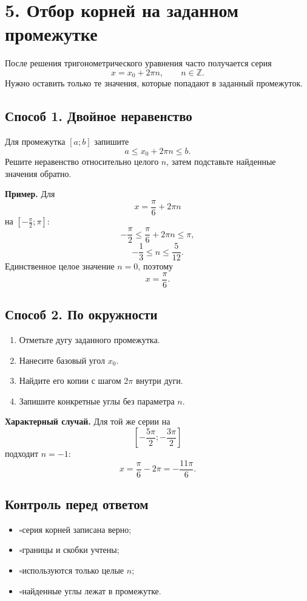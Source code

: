 \documentclass[a4paper,12pt]{article}
\newcommand{\checkitem}{\(\square\)\hspace{0.45em}}
\newcommand{\sectionrule}{\par\vspace{-0.3em}{\color{accent}\rule{\linewidth}{0.7pt}}\vspace{0.6em}}
\begin{document}
\section*{5. Отбор корней на заданном промежутке}
\sectionrule

После решения тригонометрического уравнения часто получается серия
\[
x=x_0+2\pi n,\qquad n\in\mathbb Z.
\]
Нужно оставить только те значения, которые попадают в заданный промежуток.

\begin{minipage}[t]{0.48\linewidth}
\subsection*{Способ 1. Двойное неравенство}
Для промежутка $[a;b]$ запишите
\[
a\le x_0+2\pi n\le b.
\]
Решите неравенство относительно целого $n$, затем подставьте найденные значения обратно.

\textbf{Пример.} Для
\[
x=\frac\pi6+2\pi n
\]
на $\left[-\frac\pi2;\pi\right]$:
\[
-\frac\pi2\le\frac\pi6+2\pi n\le\pi,
\]
\[
-\frac13\le n\le\frac{5}{12}.
\]
Единственное целое значение $n=0$, поэтому
\[
\boxed{x=\frac\pi6}.
\]
\end{minipage}\hfill
\begin{minipage}[t]{0.48\linewidth}
\subsection*{Способ 2. По окружности}
\begin{enumerate}[leftmargin=6mm,itemsep=2pt]
\item Отметьте дугу заданного промежутка.
\item Нанесите базовый угол $x_0$.
\item Найдите его копии с шагом $2\pi$ внутри дуги.
\item Запишите конкретные углы без параметра $n$.
\end{enumerate}

\textbf{Характерный случай.} Для той же серии на
\[
\left[-\frac{5\pi}{2};-\frac{3\pi}{2}\right]
\]
подходит $n=-1$:
\[
\boxed{x=\frac\pi6-2\pi=-\frac{11\pi}{6}}.
\]

\subsection*{Контроль перед ответом}
\begin{itemize}[leftmargin=5mm,itemsep=1.5pt]
\item \checkitem серия корней записана верно;
\item \checkitem границы и скобки учтены;
\item \checkitem используются только целые $n$;
\item \checkitem найденные углы лежат в промежутке.
\end{itemize}
\end{minipage}
\end{document}
